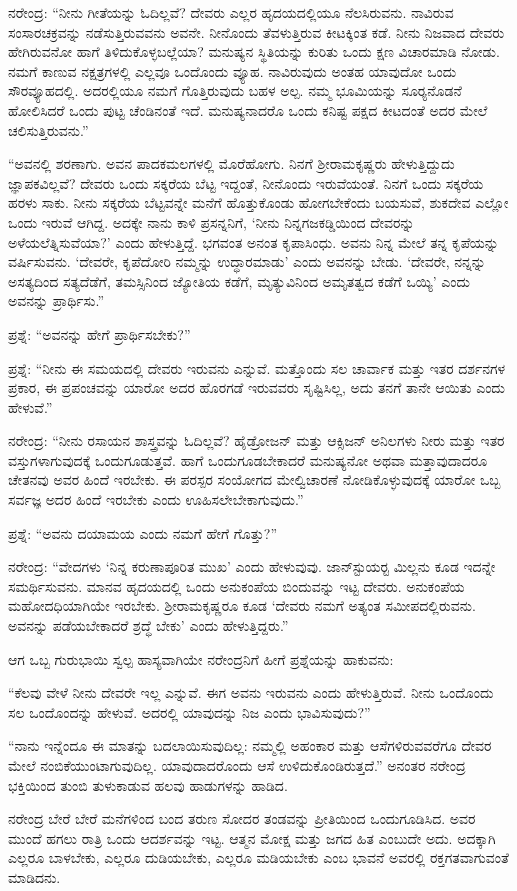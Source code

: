 ನರೇಂದ್ರ: “ನೀನು ಗೀತೆಯನ್ನು ಓದಿಲ್ಲವೆ? ದೇವರು ಎಲ್ಲರ ಹೃದಯದಲ್ಲಿಯೂ ನೆಲಸಿರುವನು. ನಾವಿರುವ ಸಂಸಾರಚಕ್ರವನ್ನು ನಡೆಸುತ್ತಿರುವವನು ಅವನೇ. ನೀನೊಂದು ತೆವಳುತ್ತಿರುವ ಕೀಟಕ್ಕಿಂತ ಕಡೆ. ನೀನು ನಿಜವಾದ ದೇವರು ಹೇಗಿರುವನೋ ಹಾಗೆ ತಿಳಿದುಕೊಳ್ಳಬಲ್ಲೆಯಾ? ಮನುಷ್ಯನ ಸ್ಥಿತಿಯನ್ನು ಕುರಿತು ಒಂದು ಕ್ಷಣ ವಿಚಾರಮಾಡಿ ನೋಡು. ನಮಗೆ ಕಾಣುವ ನಕ್ಷತ್ರಗಳಲ್ಲಿ ಎಲ್ಲವೂ ಒಂದೊಂದು ವ್ಯೂಹ. ನಾವಿರುವುದು ಅಂತಹ ಯಾವುದೋ ಒಂದು ಸೌರವ್ಯೂಹದಲ್ಲಿ. ಅದರಲ್ಲಿಯೂ ನಮಗೆ ಗೊತ್ತಿರುವುದು ಬಹಳ ಅಲ್ಪ. ನಮ್ಮ ಭೂಮಿಯನ್ನು ಸೂರ‍್ಯನೊಡನೆ ಹೋಲಿಸಿದರೆ ಒಂದು ಪುಟ್ಟ ಚೆಂಡಿನಂತೆ ಇದೆ. ಮನುಷ್ಯನಾದರೊ ಒಂದು ಕನಿಷ್ಟ ಪಕ್ಷದ ಕೀಟದಂತೆ ಅದರ ಮೇಲೆ ಚಲಿಸುತ್ತಿರುವನು.”

“ಅವನಲ್ಲಿ ಶರಣಾಗು. ಅವನ ಪಾದಕಮಲಗಳಲ್ಲಿ ಮೊರೆಹೋಗು. ನಿನಗೆ ಶ‍್ರೀರಾಮಕೃಷ್ಣರು ಹೇಳುತ್ತಿದ್ದುದು ಜ್ಞಾಪಕವಿಲ್ಲವೆ? ದೇವರು ಒಂದು ಸಕ್ಕರೆಯ ಬೆಟ್ಟ ಇದ್ದಂತೆ, ನೀನೊಂದು ಇರುವೆಯಂತೆ. ನಿನಗೆ ಒಂದು ಸಕ್ಕರೆಯ ಹರಳು ಸಾಕು. ನೀನು ಸಕ್ಕರೆಯ ಬೆಟ್ಟವನ್ನೇ ಮನೆಗೆ ಹೊತ್ತುಕೊಂಡು ಹೋಗಬೇಕೆಂದು ಬಯಸುವೆ, ಶುಕದೇವ ಎಲ್ಲೋ ಒಂದು ಇರುವೆ ಆಗಿದ್ದ. ಅದಕ್ಕೇ ನಾನು ಕಾಳಿ ಪ್ರಸನ್ನನಿಗೆ, ‘ನೀನು ನಿನ್ನ\break ಗಜಕಡ್ಡಿಯಿಂದ ದೇವರನ್ನು ಅಳೆಯಲೆತ್ನಿಸುವೆಯಾ?’ ಎಂದು ಹೇಳುತ್ತಿದ್ದೆ. ಭಗವಂತ ಅನಂತ ಕೃಪಾಸಿಂಧು. ಅವನು ನಿನ್ನ ಮೇಲೆ ತನ್ನ ಕೃಪೆಯನ್ನು ವರ್ಷಿಸುವನು. ‘ದೇವರೇ, ಕೃಪೆದೋರಿ ನಮ್ಮನ್ನು ಉದ್ಧಾರಮಾಡು’ ಎಂದು ಅವನನ್ನು ಬೇಡು. ‘ದೇವರೇ, ನನ್ನನ್ನು ಅಸತ್ಯದಿಂದ ಸತ್ಯದೆಡೆಗೆ, ತಮಸ್ಸಿನಿಂದ ಜ್ಯೋತಿಯ ಕಡೆಗೆ, ಮೃತ್ಯುವಿನಿಂದ ಅಮೃತತ್ವದ ಕಡೆಗೆ ಒಯ್ಯಿ’ ಎಂದು ಅವನನ್ನು ಪ್ರಾರ್ಥಿಸು.”

ಪ್ರಶ್ನೆ: “ಅವನನ್ನು ಹೇಗೆ ಪ್ರಾರ್ಥಿಸಬೇಕು?”

ಪ್ರಶ್ನೆ: “ನೀನು ಈ ಸಮಯದಲ್ಲಿ ದೇವರು ಇರುವನು ಎನ್ನುವೆ. ಮತ್ತೊಂದು ಸಲ ಚಾರ್ವಾಕ ಮತ್ತು ಇತರ ದರ್ಶನಗಳ ಪ್ರಕಾರ, ಈ ಪ್ರಪಂಚವನ್ನು ಯಾರೋ ಅದರ ಹೊರಗಡೆ ಇರುವವರು ಸೃಷ್ಟಿಸಿಲ್ಲ, ಅದು ತನಗೆ ತಾನೇ ಆಯಿತು ಎಂದು ಹೇಳುವೆ.”

ನರೇಂದ್ರ: “ನೀನು ರಸಾಯನ ಶಾಸ್ತ್ರವನ್ನು ಓದಿಲ್ಲವೆ? ಹೈಡ್ರೋಜನ್ ಮತ್ತು ಆಕ್ಸಿಜನ್ ಅನಿಲಗಳು ನೀರು ಮತ್ತು ಇತರ ವಸ್ತುಗಳಾಗುವುದಕ್ಕೆ ಒಂದುಗೂಡುತ್ತವೆ. ಹಾಗೆ ಒಂದುಗೂಡಬೇಕಾದರೆ ಮನುಷ್ಯನೋ ಅಥವಾ ಮತ್ತಾವುದಾದರೂ ಚೇತನವು ಅವರ ಹಿಂದೆ ಇರಬೇಕು. ಈ ಪರಸ್ಪರ ಸಂಯೋಗದ ಮೇಲ್ವಿಚಾರಣೆ ನೋಡಿಕೊಳ್ಳುವುದಕ್ಕೆ ಯಾರೋ ಒಬ್ಬ ಸರ್ವಜ್ಞ ಅದರ ಹಿಂದೆ ಇರಬೇಕು ಎಂದು ಊಹಿಸಲೇಬೇಕಾಗುವುದು.”

ಪ್ರಶ್ನೆ: “ಅವನು ದಯಾಮಯ ಎಂದು ನಮಗೆ ಹೇಗೆ ಗೊತ್ತು?”

ನರೇಂದ್ರ: “ವೇದಗಳು ‘ನಿನ್ನ ಕರುಣಾಪೂರಿತ ಮುಖ’ ಎಂದು ಹೇಳುವುವು. ಜಾನ್‍ಸ್ಟುಯರ‍್ಟ ಮಿಲ್ಲನು ಕೂಡ ಇದನ್ನೇ ಸಮರ್ಥಿಸುವನು. ಮಾನವ ಹೃದಯದಲ್ಲಿ ಒಂದು ಅನುಕಂಪೆಯ ಬಿಂದುವನ್ನು ಇಟ್ಟ ದೇವರು. ಅನುಕಂಪೆಯ ಮಹೋದಧಿಯಾಗಿಯೇ ಇರಬೇಕು. ಶ‍್ರೀರಾಮಕೃಷ್ಣರೂ ಕೂಡ ‘ದೇವರು ನಮಗೆ ಅತ್ಯಂತ ಸಮೀಪದಲ್ಲಿರುವನು. ಅವನನ್ನು ಪಡೆಯಬೇಕಾದರೆ ಶ್ರದ್ಧೆ ಬೇಕು’ ಎಂದು ಹೇಳುತ್ತಿದ್ದರು.”

ಆಗ ಒಬ್ಬ ಗುರುಭಾಯಿ ಸ್ವಲ್ಪ ಹಾಸ್ಯವಾಗಿಯೇ ನರೇಂದ್ರನಿಗೆ ಹೀಗೆ ಪ್ರಶ್ನೆಯನ್ನು ಹಾಕುವನು:

“ಕೆಲವು ವೇಳೆ ನೀನು ದೇವರೇ ಇಲ್ಲ ಎನ್ನುವೆ. ಈಗ ಅವನು ಇರುವನು ಎಂದು ಹೇಳುತ್ತಿರುವೆ. ನೀನು ಒಂದೊಂದು ಸಲ ಒಂದೊಂದನ್ನು ಹೇಳುವೆ. ಅದರಲ್ಲಿ ಯಾವುದನ್ನು ನಿಜ ಎಂದು ಭಾವಿಸುವುದು?”

“ನಾನು ಇನ್ನೆಂದೂ ಈ ಮಾತನ್ನು ಬದಲಾಯಿಸುವುದಿಲ್ಲ: ನಮ್ಮಲ್ಲಿ ಅಹಂಕಾರ ಮತ್ತು ಆಸೆಗಳಿರುವವರೆಗೂ ದೇವರ ಮೇಲೆ ನಂಬಿಕೆಯುಂಟಾಗುವುದಿಲ್ಲ. ಯಾವುದಾದರೊಂದು ಆಸೆ ಉಳಿದುಕೊಂಡಿರುತ್ತದೆ.” ಅನಂತರ ನರೇಂದ್ರ ಭಕ್ತಿಯಿಂದ ತುಂಬಿ ತುಳುಕಾಡುವ ಹಲವು ಹಾಡುಗಳನ್ನು ಹಾಡಿದ.

ನರೇಂದ್ರ ಬೇರೆ ಬೇರೆ ಮನೆಗಳಿಂದ ಬಂದ ತರುಣ ಸೋದರ ತಂಡವನ್ನು ಪ್ರೀತಿಯಿಂದ ಒಂದುಗೂಡಿಸಿದ. ಅವರ ಮುಂದೆ ಹಗಲು ರಾತ್ರಿ ಒಂದು ಆದರ್ಶವನ್ನು ಇಟ್ಟ. ಆತ್ಮನ ಮೋಕ್ಷ ಮತ್ತು ಜಗದ ಹಿತ ಎಂಬುದೇ ಅದು. ಅದಕ್ಕಾಗಿ ಎಲ್ಲರೂ ಬಾಳಬೇಕು, ಎಲ್ಲರೂ ದುಡಿಯಬೇಕು, ಎಲ್ಲರೂ ಮಡಿಯಬೇಕು ಎಂಬ ಭಾವನೆ ಅವರಲ್ಲಿ ರಕ್ತಗತವಾಗುವಂತೆ ಮಾಡಿದನು.

